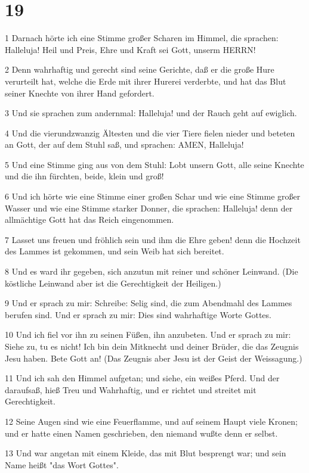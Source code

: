 \chapter{19}

\par 1 Darnach hörte ich eine Stimme großer Scharen im Himmel, die sprachen: Halleluja! Heil und Preis, Ehre und Kraft sei Gott, unserm HERRN!
\par 2 Denn wahrhaftig und gerecht sind seine Gerichte, daß er die große Hure verurteilt hat, welche die Erde mit ihrer Hurerei verderbte, und hat das Blut seiner Knechte von ihrer Hand gefordert.
\par 3 Und sie sprachen zum andernmal: Halleluja! und der Rauch geht auf ewiglich.
\par 4 Und die vierundzwanzig Ältesten und die vier Tiere fielen nieder und beteten an Gott, der auf dem Stuhl saß, und sprachen: AMEN, Halleluja!
\par 5 Und eine Stimme ging aus von dem Stuhl: Lobt unsern Gott, alle seine Knechte und die ihn fürchten, beide, klein und groß!
\par 6 Und ich hörte wie eine Stimme einer großen Schar und wie eine Stimme großer Wasser und wie eine Stimme starker Donner, die sprachen: Halleluja! denn der allmächtige Gott hat das Reich eingenommen.
\par 7 Lasset uns freuen und fröhlich sein und ihm die Ehre geben! denn die Hochzeit des Lammes ist gekommen, und sein Weib hat sich bereitet.
\par 8 Und es ward ihr gegeben, sich anzutun mit reiner und schöner Leinwand. (Die köstliche Leinwand aber ist die Gerechtigkeit der Heiligen.)
\par 9 Und er sprach zu mir: Schreibe: Selig sind, die zum Abendmahl des Lammes berufen sind. Und er sprach zu mir: Dies sind wahrhaftige Worte Gottes.
\par 10 Und ich fiel vor ihn zu seinen Füßen, ihn anzubeten. Und er sprach zu mir: Siehe zu, tu es nicht! Ich bin dein Mitknecht und deiner Brüder, die das Zeugnis Jesu haben. Bete Gott an! (Das Zeugnis aber Jesu ist der Geist der Weissagung.)
\par 11 Und ich sah den Himmel aufgetan; und siehe, ein weißes Pferd. Und der daraufsaß, hieß Treu und Wahrhaftig, und er richtet und streitet mit Gerechtigkeit.
\par 12 Seine Augen sind wie eine Feuerflamme, und auf seinem Haupt viele Kronen; und er hatte einen Namen geschrieben, den niemand wußte denn er selbst.
\par 13 Und war angetan mit einem Kleide, das mit Blut besprengt war; und sein Name heißt "das Wort Gottes".
